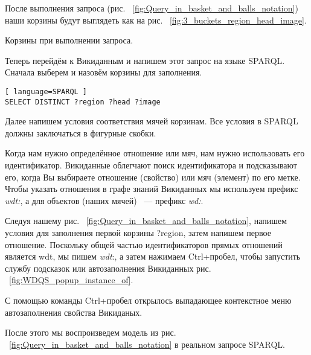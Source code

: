 \newpage
После выполнения запроса (рис. ~\ref{fig:Query_in_basket_and_balls_notation}) наши корзины будут выглядеть как на рис. ~\ref{fig:3_buckets_region_head_image}.

\begin{marginfigure}
	{
		\setlength{\fboxsep}{0pt}%
		\setlength{\fboxrule}{1pt}%
	}
    \caption{Корзины при выполнении запроса.}
	\label{fig:3_buckets_region_head_image}
\end{marginfigure}

Теперь перейдём к Викиданным и напишем этот запрос на языке SPARQL. Сначала выберем и назовём корзины для заполнения.

\begin{lstlisting}[ language=SPARQL ]
SELECT DISTINCT ?region ?head ?image
\end{lstlisting}

Далее напишем условия соответствия мячей корзинам. Все условия в SPARQL должны заключаться в фигурные скобки.

Когда нам нужно определённое отношение или мяч, нам нужно использовать его идентификатор. Викиданные облегчают поиск идентификатора и подсказывают его, когда Вы выбираете отношение (свойство) или мяч (элемент) по его метке. Чтобы указать отношения в графе знаний Викиданных мы используем префикс \textit{wdt:}, а для объектов (наших мячей) ~--- префикс \textit{wd:}.

Следуя нашему рис. ~\ref{fig:Query_in_basket_and_balls_notation}, напишем условия для заполнения первой корзины ?region, затем напишем первое отношение. Поскольку общей частью идентификаторов прямых отношений является wdt, мы пишем \textit{wdt}:, а затем нажимаем Ctrl+пробел, чтобы запустить службу подсказок или  автозаполнения Викиданных рис. ~\ref{fig:WDQS_popup_instance_of}.

\begin{marginfigure}[-2.5cm]
	{
		\setlength{\fboxsep}{0pt}%
		\setlength{\fboxrule}{1pt}%
	}
    \caption{С помощью команды Ctrl+пробел открылось выпадающее контекстное меню автозаполнения свойства Викиданых.}
	\label{fig:WDQS_popup_instance_of}
\end{marginfigure}

После этого мы воспроизведем модель из рис. ~\ref{fig:Query_in_basket_and_balls_notation} в реальном запросе SPARQL.

